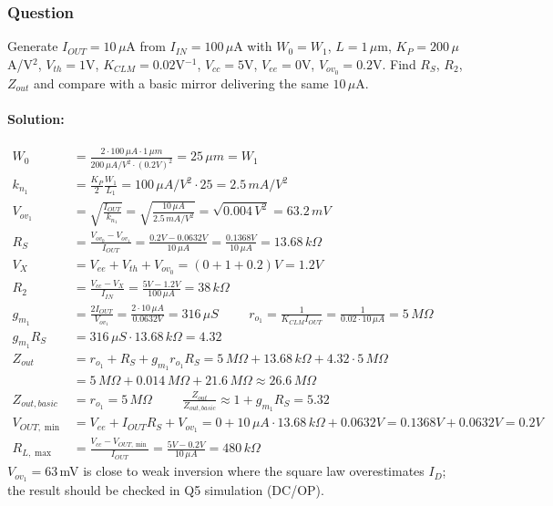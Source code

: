 \subsubsection{Question}
Generate \(I_{OUT} = 10\,\mu\)A from \(I_{IN} = 100\,\mu\)A with
\(W_0 = W_1\), \(L = 1\,\mu\)m, \(K_P = 200\,\mu\)A/V\(^2\), \(V_{th} = 1\)V,
\(K_{CLM} = 0.02\)V\(^{-1}\), \(V_{cc} = 5\)V, \(V_{ee} = 0\)V,
\(V_{ov_0} = 0.2\)V. Find \(R_S\), \(R_2\), \(Z_{out}\) and compare with a
basic mirror delivering the same \(10\,\mu\)A.
\paragraph{Solution:}
\begin{align*}
  W_0 &= \frac{2 \cdot 100\,\mu A \cdot 1\,\mu m}{200\,\mu A/V^2 \cdot (0.2V)^2} = 25\,\mu m = W_1 \\
  k_{n_1} &= \frac{K_P}{2}\frac{W_1}{L_1} = 100\,\mu A/V^2 \cdot 25 = 2.5\,mA/V^2 \\
  V_{ov_1} &= \sqrt{\frac{I_{OUT}}{k_{n_1}}} = \sqrt{\frac{10\,\mu A}{2.5\,mA/V^2}} = \sqrt{0.004\,V^2} = 63.2\,mV \\
  R_S &= \frac{V_{ov_0} - V_{ov_1}}{I_{OUT}} = \frac{0.2V - 0.0632V}{10\,\mu A} = \frac{0.1368V}{10\,\mu A} = 13.68\,k\Omega \\
  V_X &= V_{ee} + V_{th} + V_{ov_0} = (0 + 1 + 0.2)V = 1.2V \\
  R_2 &= \frac{V_{cc} - V_X}{I_{IN}} = \frac{5V - 1.2V}{100\,\mu A} = 38\,k\Omega \\
  g_{m_1} &= \frac{2 I_{OUT}}{V_{ov_1}} = \frac{2 \cdot 10\,\mu A}{0.0632V} = 316\,\mu S \hspace{1cm}
  r_{o_1} = \frac{1}{K_{CLM} I_{OUT}} = \frac{1}{0.02 \cdot 10\,\mu A} = 5\,M\Omega \\
  g_{m_1} R_S &= 316\,\mu S \cdot 13.68\,k\Omega = 4.32 \\
  Z_{out} &= r_{o_1} + R_S + g_{m_1} r_{o_1} R_S = 5\,M\Omega + 13.68\,k\Omega + 4.32 \cdot 5\,M\Omega \\
          &= 5\,M\Omega + 0.014\,M\Omega + 21.6\,M\Omega \approx 26.6\,M\Omega \\
  Z_{out,basic} &= r_{o_1} = 5\,M\Omega \hspace{1cm} \frac{Z_{out}}{Z_{out,basic}} \approx 1 + g_{m_1} R_S = 5.32 \\
  V_{OUT,\min} &= V_{ee} + I_{OUT} R_S + V_{ov_1} = 0 + 10\,\mu A \cdot 13.68\,k\Omega + 0.0632V = 0.1368V + 0.0632V = 0.2V \\
  R_{L,\max} &= \frac{V_{cc} - V_{OUT,\min}}{I_{OUT}} = \frac{5V - 0.2V}{10\,\mu A} = 480\,k\Omega
\end{align*}
\(V_{ov_1} = 63\,\)mV is close to weak inversion where the square law
overestimates \(I_D\); the result should be checked in Q5 simulation
(DC/OP).

